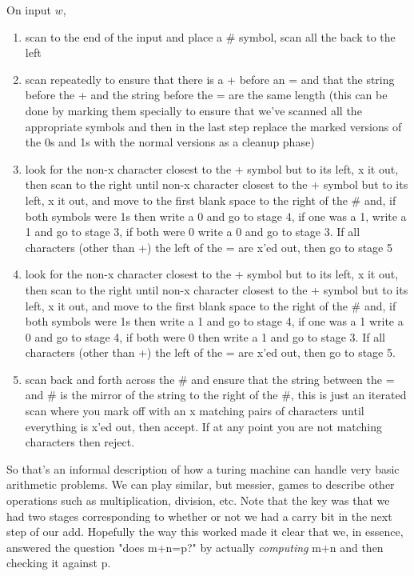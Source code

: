 \documentclass[11pt]{article}
\begin{document}
On input $w$,
\begin{enumerate}
\item scan to the end of the input and place a \# symbol, scan all the back to the left
\item scan repeatedly to ensure that there is a + before an = and that the string before the + and the string before the = are the same length (this can be done by marking them specially to ensure that we've scanned all the appropriate symbols and then in the last step replace the marked versions of the 0s and 1s with the normal versions as a cleanup phase)
\item look for the non-x character closest to the + symbol but to its left, x it out, then scan to the right until non-x character closest to the + symbol but to its left, x it out, and move to the first blank space to the right of the \# and, if both symbols were 1s then write a 0 and go to stage 4, if one was a 1, write a 1 and go to stage 3, if both were 0 write a 0 and go to stage 3. If all characters (other than +) the left of the = are x'ed out, then go to stage 5
\item look for the non-x character closest to the + symbol but to its left, x it out, then scan to the right until non-x character closest to the + symbol but to its left, x it out, and move to the first blank space to the right of the \# and, if both symbols were 1s then write a 1 and go to stage 4, if one was a 1 write a 0 and go to stage 4, if both were 0 then write a 1 and go to stage 3. If all characters (other than +) the left of the = are x'ed out, then go to stage 5.
\item scan back and forth across the \# and ensure that the string between the = and \# is the mirror of the string to the right of the \#, this is just an iterated scan where you mark off with an x matching pairs of characters until everything is x'ed out, then accept. If at any point you are not matching characters then reject.
\end{enumerate}

So that's an informal description of how a turing machine can handle very basic arithmetic problems. We can play similar, but messier, games to describe other operations such as multiplication, division, etc. Note that the key was that we had two stages corresponding to whether or not we had a carry bit in the next step of our add. Hopefully the way this worked made it clear that we, in essence, answered the question "does m+n=p?" by actually \emph{computing} m+n and then checking it against p.
\end{document}

